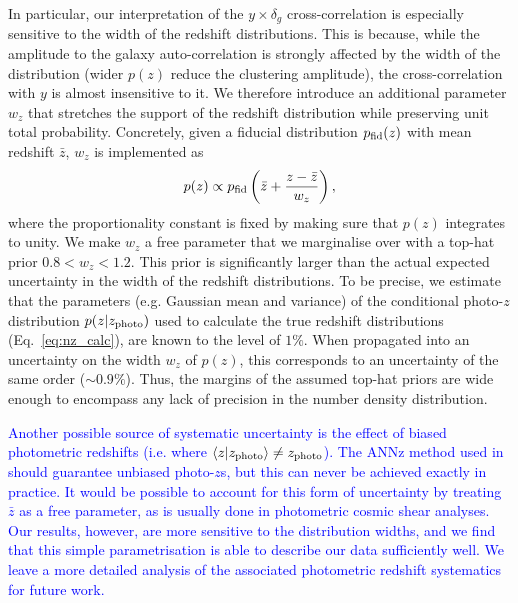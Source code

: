 \documentclass[useAMS,usenatbib]{mn2e}
\newcommand{\DA}[1]{\textcolor{blue}{#1}}
\begin{document}
      In particular, our interpretation of the $y\times \delta_g$ cross-correlation is especially sensitive to the width of the redshift distributions. This is because, while the amplitude to the galaxy auto-correlation is strongly affected by the width of the distribution (wider $p(z)$ reduce the clustering amplitude), the cross-correlation with $y$ is almost insensitive to it. We therefore introduce an additional parameter $w_z$ that stretches the support of the redshift distribution while preserving unit total probability. Concretely, given a fiducial distribution $p_{\rm fid}(z)$ with mean redshift $\bar{z}$, $w_z$ is implemented as
      \begin{equation}
        p(z)\propto p_{\rm fid}\left(\bar{z}+\frac{z-\bar{z}}{w_z}\right),
      \end{equation}
      where the proportionality constant is fixed by making sure that $p(z)$ integrates to unity. We make $w_z$ a free parameter that we marginalise over with a top-hat prior $0.8<w_z<1.2$. This prior is significantly larger than the actual expected uncertainty in the width of the redshift distributions. To be precise, we estimate that the parameters (e.g. Gaussian mean and variance) of the conditional photo-$z$ distribution $p(z|z_{\rm photo})$ used to calculate the true redshift distributions (Eq.\!~\ref{eq:nz_calc}), are known to the level of $1\%$. When propagated into an uncertainty on the width $w_z$ of $p(z)$, this corresponds to an uncertainty of the same order ($\sim0.9\%$). Thus, the margins of the assumed top-hat priors are wide enough to encompass any lack of precision in the number density distribution.
      
      \DA{Another possible source of systematic uncertainty is the effect of biased photometric redshifts (i.e. where $\langle z|z_{\rm photo}\rangle\neq z_{\rm photo}$). The ANNz method used in \cite{2018MNRAS.481.1133P} should guarantee unbiased photo-$z$s, but this can never be achieved exactly in practice. It would be possible to account for this form of uncertainty by treating $\bar{z}$ as a free parameter, as is usually done in photometric cosmic shear analyses. Our results, however, are more sensitive to the distribution widths, and we find that this simple parametrisation is able to describe our data sufficiently well. We leave a more detailed analysis of the associated photometric redshift systematics for future work.}
\end{document}

